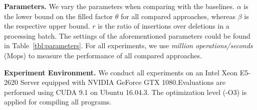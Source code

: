 \vspace{1mm}\noindent\textbf{Parameters.}
We vary the parameters when comparing \voter with the baselines.
$\alpha$ is the lower bound on the filled factor $\theta$ for all compared approaches,
whereas $\beta$ is the respective upper bound.
$r$ is the ratio of insertions over deletions in a processing batch. 
The settings of the aforementioned parameters could be found in Table~\ref{tbl:parameters}. For all experiments, we use \emph{million operations/seconds} (Mops) to measure the performance of all compared approaches.

\vspace{1mm}\noindent\textbf{Experiment Environment.}
We conduct all experiments on an Intel Xeon E5-2620 Server equipped with NVIDIA GeForce GTX 1080.Evaluations are performed using CUDA 9.1 on Ubuntu 16.04.3. The optimization level (-O3) is applied for compiling all programs.



